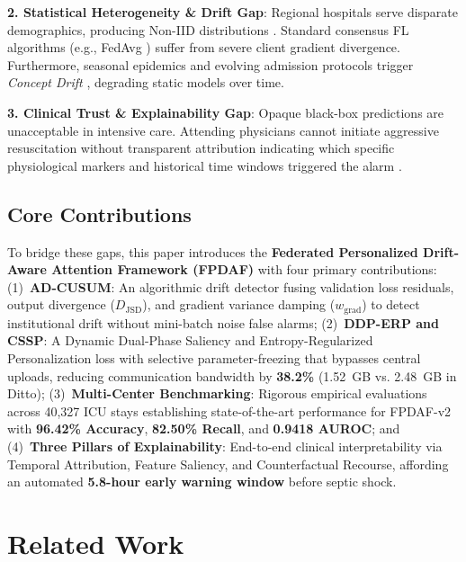 \documentclass{llncs}
\begin{document}
\noindent\textbf{2. Statistical Heterogeneity \& Drift Gap}: Regional hospitals serve disparate demographics, producing Non-IID distributions \cite{jothimurugesan2022, pan2025multiprog}. Standard consensus FL algorithms (e.g., FedAvg \cite{mcmahan2017}) suffer from severe client gradient divergence. Furthermore, seasonal epidemics and evolving admission protocols trigger \textit{Concept Drift} \cite{yuan2024trend}, degrading static models over time.

\noindent\textbf{3. Clinical Trust \& Explainability Gap}: Opaque black-box predictions are unacceptable in intensive care. Attending physicians cannot initiate aggressive resuscitation without transparent attribution indicating which specific physiological markers and historical time windows triggered the alarm \cite{larocca2022shap}.

\subsection{Core Contributions}
To bridge these gaps, this paper introduces the \textbf{Federated Personalized Drift-Aware Attention Framework (FPDAF)} with four primary contributions: (1)~\textbf{AD-CUSUM}: An algorithmic drift detector fusing validation loss residuals, output divergence ($D_{\mathrm{JSD}}$), and gradient variance damping ($w_{\mathrm{grad}}$) to detect institutional drift without mini-batch noise false alarms; (2)~\textbf{DDP-ERP and CSSP}: A Dynamic Dual-Phase Saliency and Entropy-Regularized Personalization loss with selective parameter-freezing that bypasses central uploads, reducing communication bandwidth by \textbf{38.2\%} (1.52~GB vs. 2.48~GB in Ditto); (3)~\textbf{Multi-Center Benchmarking}: Rigorous empirical evaluations across 40,327 ICU stays establishing state-of-the-art performance for FPDAF-v2 with \textbf{96.42\% Accuracy}, \textbf{82.50\% Recall}, and \textbf{0.9418 AUROC}; and (4)~\textbf{Three Pillars of Explainability}: End-to-end clinical interpretability via Temporal Attribution, Feature Saliency, and Counterfactual Recourse, affording an automated \textbf{5.8-hour early warning window} before septic shock.

\section{Related Work}
\label{sec:related}
\end{document}
